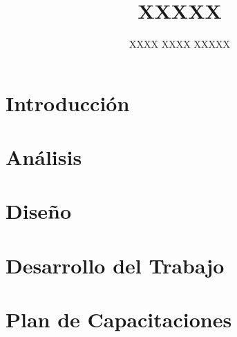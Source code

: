 \documentclass[final,letterpaper,oneside,authoryear,11pt,singlespace,spanish]{ezthesis}
\author{XXXX XXXX XXXXX}
\title{XXXXX}
\begin{document}
\cleardoublepage
{}
\setcounter{page}{1}





%





\renewcommand\contentsname{Índice General}
\tableofcontents


\renewcommand{\listfigurename}{Índice de Figuras}
\listoffigures


\renewcommand{\listtablename}{Índice de Tablas}
\listoftables

\cleardoublepage
{}
\setcounter{page}{1}

\chapter{Introducción}
\label{cap:introduccion}


\chapter{Análisis} 
\label{cap:analisis}


\chapter{Diseño} 
\label{cap:disenno}


\chapter{Desarrollo del Trabajo} 
\label{cap:desarrollo}


\chapter{Plan de Capacitaciones} 
\label{cap:capacitacion}

\end{document}
